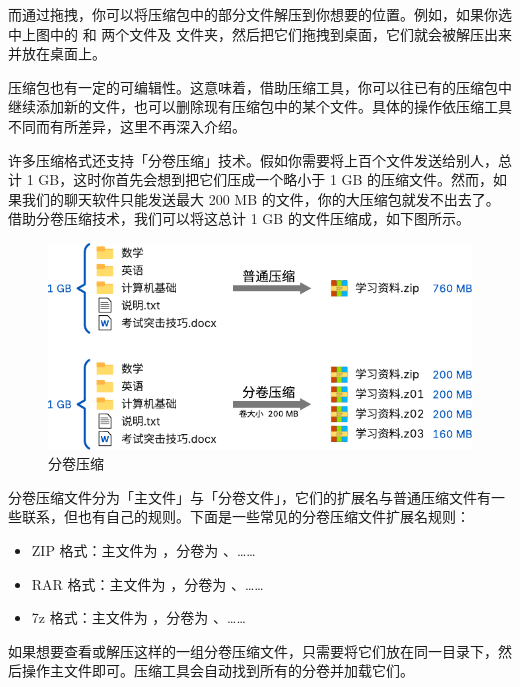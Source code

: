 {而通过拖拽，你可以将压缩包中的部分文件解压到你想要的位置。例如，如果你选中上图中的  和  两个文件及  文件夹，然后把它们拖拽到桌面，它们就会被解压出来并放在桌面上。

\begin{note}
  压缩包也有一定的可编辑性。这意味着，借助压缩工具，你可以往已有的压缩包中继续添加新的文件，也可以删除现有压缩包中的某个文件。具体的操作依压缩工具不同而有所差异，这里不再深入介绍。
\end{note}

许多压缩格式还支持「分卷压缩」技术。假如你需要将上百个文件发送给别人，总计 1 GB，这时你首先会想到把它们压成一个略小于 1 GB 的压缩文件。然而，如果我们的聊天软件只能发送最大 200 MB 的文件，你的大压缩包就发不出去了。借助分卷压缩技术，我们可以将这总计 1 GB 的文件压缩成，如下图所示。

\begin{figure}[htb!]
  \centering
  \includegraphics[width=.7\textwidth]{assets/software/Split_archive.pdf}
  \caption{分卷压缩}
  \label{fig:Split_archive}
\end{figure}

分卷压缩文件分为「主文件」与「分卷文件」，它们的扩展名与普通压缩文件有一些联系，但也有自己的规则。下面是一些常见的分卷压缩文件扩展名规则：
\begin{itemize}
  \item ZIP 格式：主文件为 ，分卷为 、……
  \item RAR 格式：主文件为 ，分卷为 、……
  \item 7z 格式：主文件为 ，分卷为 、……
\end{itemize}

如果想要查看或解压这样的一组分卷压缩文件，只需要将它们放在同一目录下，然后操作主文件即可。压缩工具会自动找到所有的分卷并加载它们。

}
